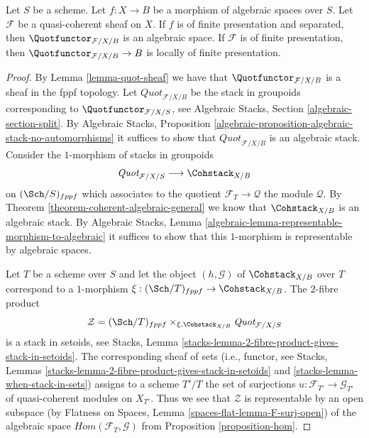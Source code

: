 \begin{proposition}
\label{proposition-quot}
Let $S$ be a scheme. Let $f : X \to B$ be a morphism of algebraic
spaces over $S$. Let $\mathcal{F}$ be a quasi-coherent sheaf
on $X$. If $f$ is of finite presentation and separated, then
$\Quotfunctor_{\mathcal{F}/X/B}$
is an algebraic space. If $\mathcal{F}$ is of finite presentation,
then $\Quotfunctor_{\mathcal{F}/X/B} \to B$ is locally of finite presentation.
\end{proposition}

\begin{proof}
By Lemma \ref{lemma-quot-sheaf}
we have that $\Quotfunctor_{\mathcal{F}/X/B}$ is a sheaf in the
fppf topology. Let $\textit{Quot}_{\mathcal{F}/X/B}$ be the stack in
groupoids corresponding to $\Quotfunctor_{\mathcal{F}/X/S}$, see
Algebraic Stacks, Section \ref{algebraic-section-split}.
By Algebraic Stacks, Proposition
\ref{algebraic-proposition-algebraic-stack-no-automorphisms}
it suffices to show that $\textit{Quot}_{\mathcal{F}/X/B}$
is an algebraic stack.
Consider the $1$-morphism of stacks in groupoids
$$
\textit{Quot}_{\mathcal{F}/X/S}
\longrightarrow
\Cohstack_{X/B}
$$
on $(\Sch/S)_{fppf}$ which associates to the quotient
$\mathcal{F}_T \to \mathcal{Q}$ the module $\mathcal{Q}$.
By Theorem \ref{theorem-coherent-algebraic-general} we know that
$\Cohstack_{X/B}$ is an algebraic stack.
By Algebraic Stacks, Lemma
\ref{algebraic-lemma-representable-morphism-to-algebraic}
it suffices to show that this $1$-morphism is representable
by algebraic spaces.

\medskip\noindent
Let $T$ be a scheme over $S$ and let the object $(h, \mathcal{G})$ of
$\Cohstack_{X/B}$ over $T$ correspond
to a $1$-morphism $\xi : (\Sch/T)_{fppf} \to \Cohstack_{X/B}$.
The $2$-fibre product
$$
\mathcal{Z} =
(\Sch/T)_{fppf}
\times_{\xi, \Cohstack_{X/B}}
\textit{Quot}_{\mathcal{F}/X/S}
$$
is a stack in setoids, see
Stacks, Lemma \ref{stacks-lemma-2-fibre-product-gives-stack-in-setoids}.
The corresponding sheaf of sets (i.e., functor, see
Stacks, Lemmas
\ref{stacks-lemma-2-fibre-product-gives-stack-in-setoids} and
\ref{stacks-lemma-when-stack-in-sets}) assigns to a scheme
$T'/T$ the set of surjections $u : \mathcal{F}_{T'} \to \mathcal{G}_{T'}$
of quasi-coherent modules on $X_{T'}$. Thus we see that
$\mathcal{Z}$ is representable by an open subspace
(by Flatness on Spaces, Lemma \ref{spaces-flat-lemma-F-surj-open})
of the algebraic space
$\mathit{Hom}(\mathcal{F}_T, \mathcal{G})$ from
Proposition \ref{proposition-hom}.
\end{proof}

